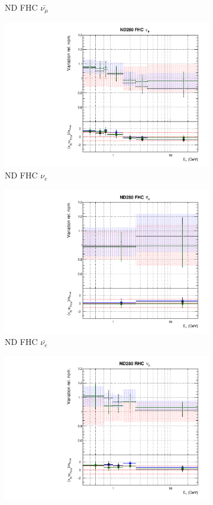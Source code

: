 \begin{figure}
\begin{subfigure}{0.24\textwidth}
  \caption{ND FHC $\bar{\nu_{\mu}}$}
\end{subfigure}
\begin{subfigure}{0.24\textwidth}
  \centering
  \includegraphics[width=0.95\linewidth]{figs/fgdfitsflux_2}
  \caption{ND FHC $\nu_e$}
\end{subfigure}
\begin{subfigure}{0.24\textwidth}
  \centering
  \includegraphics[width=0.95\linewidth]{figs/fgdfitsflux_3}
  \caption{ND FHC $\bar{\nu_{e}}$}  
\end{subfigure}
\begin{subfigure}{0.24\textwidth}
  \centering
  \includegraphics[width=0.95\linewidth]{figs/fgdfitsflux_4}

\end{subfigure}
\end{figure}
